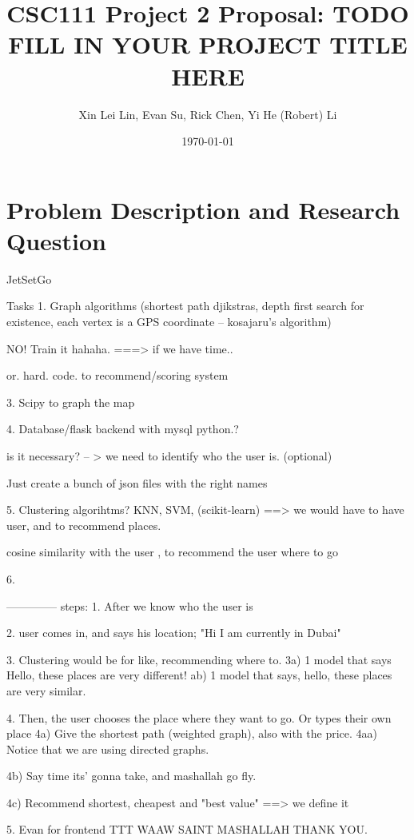 \documentclass[fontsize=11pt]{article}
\title{CSC111 Project 2 Proposal: TODO FILL IN YOUR PROJECT TITLE HERE}
\author{Xin Lei Lin, Evan Su, Rick Chen, Yi He (Robert) Li}
\date{\today}
\begin{document}
\maketitle

\section*{Problem Description and Research Question}
JetSetGo


Tasks
1. Graph algorithms (shortest path djikstras, depth first search for existence, 
each vertex is a GPS coordinate -- kosajaru's algorithm) 

 NO! Train it hahaha. ===> if we have time..

or. hard. code.
to recommend/scoring system

3. Scipy to graph the map

4. Database/flask backend with mysql python.?

is it necessary?
-- > we need to identify who the user is.
(optional)

Just create a bunch of json files with the right names

5. Clustering algorihtms? KNN, SVM, (scikit-learn) ==> we would have to have user, and to recommend places.

cosine similarity with the user , to recommend the user where to go

6. 


--------------
steps:
1. After we know who the user is

2. user comes in, and says his location; "Hi I am currently in Dubai"

3. Clustering would be for like, recommending where to.
    3a) 1 model that says Hello, these places are very different!
    ab) 1 model that says, hello, these places are very similar.

4. Then, the user chooses the place where they want to go. Or types their own place
    4a) Give the shortest path (weighted graph), also with the price.
        4aa) Notice that we are using directed graphs.
    
    4b) Say time its' gonna take, and mashallah go fly.

    4c) Recommend shortest, cheapest and "best value" ==> we define it

5. Evan for frontend TTT WAAW SAINT MASHALLAH THANK YOU.
    
\end{document}
